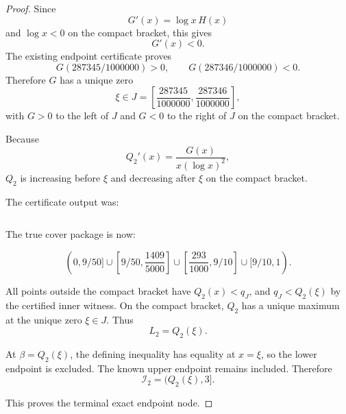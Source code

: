 \begin{proof}
Since
\[
G'(x)=\log x\,H(x)
\]
and \(\log x<0\) on the compact bracket, this gives
\[
G'(x)<0.
\]
The existing endpoint certificate proves
\[
G(287345/1000000)>0,
\qquad
G(287346/1000000)<0.
\]
Therefore \(G\) has a unique zero
\[
\xi\in J=\left[\frac{287345}{1000000},\frac{287346}{1000000}\right],
\]
with \(G>0\) to the left of \(J\) and \(G<0\) to the right of \(J\) on the compact bracket.

Because
\[
Q_2'(x)=\frac{G(x)}{x(\log x)^2},
\]
\(Q_2\) is increasing before \(\xi\) and decreasing after \(\xi\) on the compact bracket.

The certificate output was:

\begin{verbatim}
\end{verbatim}

The true cover package is now:

\[
(0,9/50]\cup
\left[9/50,\frac{1409}{5000}\right]\cup
\left[\frac{293}{1000},9/10\right]\cup
[9/10,1).
\]

All points outside the compact bracket have \(Q_2(x)<q_J\), and \(q_J<Q_2(\xi)\) by the certified inner witness. On the compact bracket, \(Q_2\) has a unique maximum at the unique zero \(\xi\in J\). Thus
\[
L_2=Q_2(\xi).
\]

At \(\beta=Q_2(\xi)\), the defining inequality has equality at \(x=\xi\), so the lower endpoint is excluded. The known upper endpoint remains included. Therefore
\[
\mathcal I_2=(Q_2(\xi),3].
\]

This proves the terminal exact endpoint node.
\end{proof}

